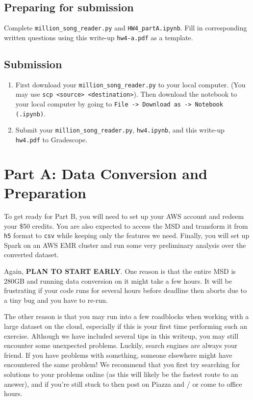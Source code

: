 \subsection{Preparing for submission}
Complete \texttt{million\_song\_reader.py} and \texttt{HW4\_partA.ipynb}. Fill in corresponding written questions using this write-up \texttt{hw4-a.pdf} as a template. 

\subsection{Submission}
\begin{enumerate}
    \item First download your \texttt{million\_song\_reader.py} to your local computer. (You may use \texttt{scp <source> <destination>}). Then download the notebook to your local computer by going to \texttt{File -> Download as -> Notebook (.ipynb)}.
    \item Submit your \texttt{million\_song\_reader.py}, \texttt{hw4.ipynb}, and this write-up \texttt{hw4.pdf} to Gradescope.
\end{enumerate}

\clearpage
    
\section{Part A: Data Conversion and Preparation}
To get ready for Part B, you will need to set up your AWS account and redeem your \$50 credits. You are also expected to access the MSD and transform it from \texttt{h5} format to \texttt{csv} while keeping only the features we need. Finally, you will set up Spark on an AWS EMR cluster and run some very preliminary analysis over the converted dataset.

Again, \textbf{PLAN TO START EARLY}. One reason is that the entire MSD is 280GB and running data conversion on it might take a few hours. It will be frustrating if your code runs for several hours before deadline then aborts due to a tiny bug and you have to re-run. 

The other reason is that you may run into a few roadblocks when working with a large dataset on the cloud, especially if this is your first time performing such an exercise. Although we have included several tips in this writeup, you may still encounter some unexpected problems. Luckily, search engines are always your friend. If you have problems with something, someone elsewhere might have encountered the same problem! We recommend that you first try searching for solutions to your problems online (as this will likely be the fastest route to an answer), and if you're still stuck to then post on Piazza and / or come to office hours.

